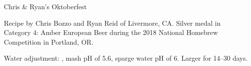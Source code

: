 \begin{recipe}{Chris \& Ryan's Oktoberfest} %

\begin{aboutblock}
Recipe by Chris Bozzo and Ryan Reid of Livermore, CA. Silver medal in Category 4:
Amber European Beer during the 2018 National Homebrew Competition in Portland, OR.
\sourceaha
\end{aboutblock}


\begin{methodandtiming}

\begin{mashsteps}
\end{mashsteps}

\begin{fermentationsteps}
\end{fermentationsteps}

\begin{directions}
Water adjustment: , mash pH of 5.6, sparge
water pH of 6. Larger for 14--30 days.
\end{directions}

\end{methodandtiming}

\recipebreak

\begin{ingredientsblock}

\begin{malts}
\end{malts}

\begin{hops}
\end{hops}


\end{ingredientsblock}

\end{recipe}

